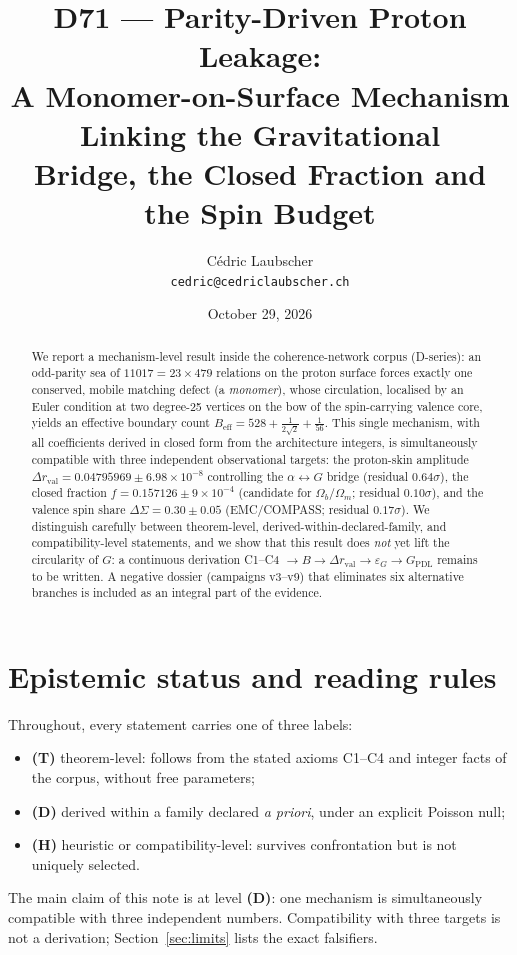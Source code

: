 \documentclass[11pt,a4paper]{article}
\title{D71 --- Parity-Driven Proton Leakage:\\ A Monomer-on-Surface Mechanism Linking the Gravitational\\ Bridge, the Closed Fraction and the Spin Budget}
\author{C\'edric Laubscher\\ \small \texttt{cedric@cedriclaubscher.ch}}
\date{October 29, 2026}
\newcommand{\Dr}{\Delta r_{\mathrm{val}}}
\begin{document}
\maketitle

\begin{abstract}
\noindent We report a mechanism-level result inside the coherence-network corpus (D-series): an odd-parity sea of $11017 = 23 \times 479$ relations on the proton surface forces exactly one conserved, mobile matching defect (a \emph{monomer}), whose circulation, localised by an Euler condition at two degree-25 vertices on the bow of the spin-carrying valence core, yields an effective boundary count $B_{\mathrm{eff}} = 528 + \tfrac{1}{2\sqrt{2}} + \tfrac{1}{56}$. This single mechanism, with all coefficients derived in closed form from the architecture integers, is simultaneously compatible with three independent observational targets: the proton-skin amplitude $\Dr = 0.04795969 \pm 6.98\times 10^{-8}$ controlling the $\alpha \leftrightarrow G$ bridge (residual $0.64\sigma$), the closed fraction $f = 0.157126 \pm 9\times 10^{-4}$ (candidate for $\Omega_b/\Omega_m$; residual $0.10\sigma$), and the valence spin share $\Delta\Sigma = 0.30 \pm 0.05$ (EMC/COMPASS; residual $0.17\sigma$). We distinguish carefully between theorem-level, derived-within-declared-family, and compatibility-level statements, and we show that this result does \emph{not} yet lift the circularity of $G$: a continuous derivation C1--C4 $\to B \to \Dr \to \varepsilon_G \to G_{\mathrm{PDL}}$ remains to be written. A negative dossier (campaigns v3--v9) that eliminates six alternative branches is included as an integral part of the evidence.
\end{abstract}

\section{Epistemic status and reading rules}
Throughout, every statement carries one of three labels:
\begin{itemize}[leftmargin=1.6em]
\item \textbf{(T)} theorem-level: follows from the stated axioms C1--C4 and integer facts of the corpus, without free parameters;
\item \textbf{(D)} derived within a family declared \emph{a priori}, under an explicit Poisson null;
\item \textbf{(H)} heuristic or compatibility-level: survives confrontation but is not uniquely selected.
\end{itemize}
The main claim of this note is at level \textbf{(D)}: one mechanism is simultaneously compatible with three independent numbers. Compatibility with three targets is not a derivation; Section~\ref{sec:limits} lists the exact falsifiers.
\end{document}
